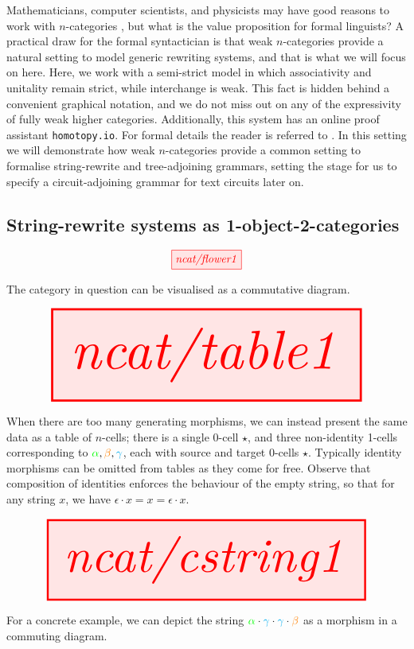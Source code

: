 Mathematicians, computer scientists, and physicists may have good reasons to work with $n$-categories \citep{baezIntroductionNCategories1997}, but what is the value proposition for formal linguists? A practical draw for the formal syntactician is that weak $n$-categories provide a natural setting to model generic rewriting systems, and that is what we will focus on here. Here, we work with a semi-strict model in which associativity and unitality remain strict, while interchange is weak. This fact is hidden behind a convenient graphical notation, and we do not miss out on any of the expressivity of fully weak higher categories. Additionally, this system has an online proof assistant \texttt{homotopy.io}. For formal details the reader is referred to \citep{nlabauthorsHomotopyIoNLab,dornAssociativeCategories2023,reutterHighlevelMethodsHomotopy2019c,heidemannZigzagNormalisationAssociative2022}. In this setting we will demonstrate how weak $n$-categories provide a common setting to formalise string-rewrite and tree-adjoining grammars, setting the stage for us to specify a circuit-adjoining grammar for text circuits later on.

\newpage

\subsection{String-rewrite systems as 1-object-2-categories}

\begin{marginfigure}
\centering
\[\tikzfig{ncat/flower1}\]
\caption{The category in question can be visualised as a commutative diagram.}
\end{marginfigure}

\begin{marginfigure}
\centering
\[\resizebox{\textwidth}{!}{\tikzfig{ncat/table1}}\]
\caption{When there are too many generating morphisms, we can instead present the same data as a table of $n$-cells; there is a single 0-cell $\star$, and three non-identity 1-cells corresponding to $\textcolor{green}{\alpha}, \textcolor{orange}{\beta}, \textcolor{cyan}{\gamma}$, each with source and target 0-cells $\star$. Typically identity morphisms can be omitted from tables as they come for free. Observe that composition of identities enforces the behaviour of the empty string, so that for any string $x$, we have $\epsilon \cdot x = x = \epsilon \cdot x$.}
\end{marginfigure}

\begin{marginfigure}
\centering
\[\resizebox{\textwidth}{!}{\tikzfig{ncat/cstring1}}\]
\caption{For a concrete example, we can depict the string $\textcolor{green}{\alpha} \cdot \textcolor{cyan}{\gamma} \cdot \textcolor{cyan}{\gamma} \cdot \textcolor{orange}{\beta}$ as a morphism in a commuting diagram.}
\end{marginfigure}

